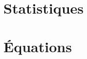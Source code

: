 \documentclass{main}
\begin{document}
        \chapter[statistiques]{Statistiques}
            \sequencage
            \cours

        \chapter[equations]{Équations}
            \sequencage
            \cours
\end{document}
